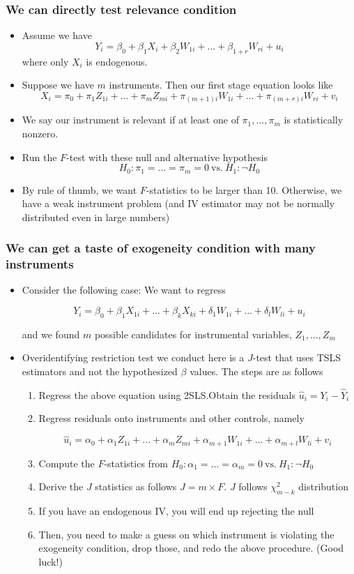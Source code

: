 \documentclass[aspectratio=169]{beamer}
\begin{document}
\begin{frame}
\frametitle{We can directly test relevance condition}
\begin{itemize}
\item Assume we have
\[
Y_i = \beta_0 + \beta_1X_i + \beta_2 W_{1i}+...+\beta_{1+r}W_{ri}+u_i
\]
where only $X_i$ is endogenous. 
\item Suppose we have $m$ instruments. Then our first stage equation looks like
\[
X_i = \pi_0 + \pi_1Z_{1i}+...+\pi_mZ_{mi} + \pi_{(m+1)i} W_{1i}+...+ \pi_{(m+r)i}W_{ri}+v_i
\]
\item We say our instrument is relevant if at least one of $\pi_1,...,\pi_m$ is statistically nonzero. 
\item Run the $F$-test with these null and alternative hypothesis
\[
H_0: \pi_1 = ... = \pi_m=0 \ \text{vs.} \ H_1: \lnot H_0
\]
\item By rule of thumb, we want $F$-statistics to be larger than 10. Otherwise, we have a weak instrument problem (and IV estimator may not be normally distributed even in large numbers)
\end{itemize}
\end{frame}

\begin{frame}
\frametitle{We can get a taste of exogeneity condition with many instruments}
\begin{itemize}
\item  Consider the following case: We want to regress
\begin{scriptsize}
\[
Y_i = \beta_0 + \beta_1X_{1i} +...+ \beta_kX_{ki} + \delta_1W_{1i}+...+\delta_lW_{li}+u_i 
\]
\end{scriptsize}
and we found $m$ possible candidates for instrumental variables, $Z_1,...,Z_m$
\item Overidentifying restriction test we conduct here is a $J$-test that uses TSLS estimators and not the hypothesized $\beta$ values. The steps are as follows
\begin{enumerate}
\item Regress the above equation using 2SLS.Obtain the residuals $\hat{u}_i=Y_i-\widehat{Y}_i$
\item Regress residuals onto instruments and other controls, namely
\begin{scriptsize}
\[
\hat{u}_i = \alpha_0 + \alpha_1 Z_{1i}+ ... + \alpha_m Z_{mi} + \alpha_{m+1}W_{1i}+ ... + \alpha_{m+l}W_{li}+v_i
\]
\end{scriptsize}
\item Compute the $F$-statistics from $H_0: \alpha_1 = ... = \alpha_m=0\ \text{vs.} \ H_1: \lnot H_0$
\item Derive the $J$ statistics as follows $J = m\times F$. $J$ follows $\chi^2_{m-k}$ distribution 
\item If you have an endogenous IV, you will end up rejecting the null
\item Then, you need to make a guess on which instrument is violating the exogeneity condition, drop those, and redo the above procedure. (Good luck!)
\end{enumerate}

\end{itemize}
\end{frame}
\end{document}
